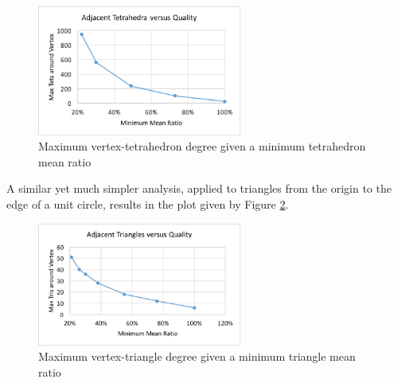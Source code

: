 \begin{figure}
\begin{center}
\includegraphics[width=0.6\textwidth]{max_tet_deg.png}
\caption{Maximum vertex-tetrahedron degree given a minimum tetrahedron mean ratio}
\label{fig:max_tet_deg}
\end{center}
\end{figure}

A similar yet much simpler analysis, applied to triangles
from the origin to the edge of a unit circle, results in the
plot given by Figure \ref{fig:max_tri_deg}.

\begin{figure}
\begin{center}
\includegraphics[width=0.6\textwidth]{max_tri_deg.png}
\caption{Maximum vertex-triangle degree given a minimum triangle mean ratio}
\label{fig:max_tri_deg}
\end{center}
\end{figure}
